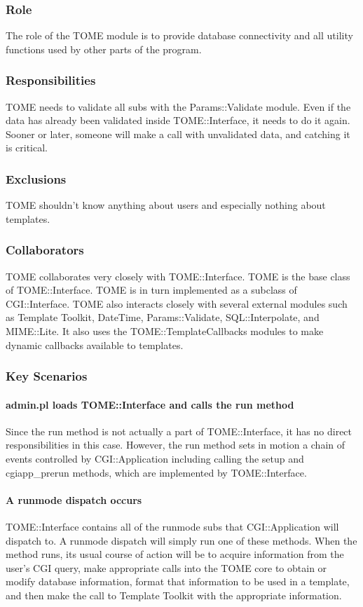 \documentclass[12pt,titlepage]{article}
\begin{document}
\subsubsection{Role}
The role of the TOME module is to provide database connectivity and all utility functions used by other parts of the program.
\subsubsection{Responsibilities}
TOME needs to validate all subs with the Params::Validate module. Even if the data has already been validated inside TOME::Interface, it needs to do it again. Sooner or later, someone will make a call with unvalidated data, and catching it is critical.
\subsubsection{Exclusions}
TOME shouldn't know anything about users and especially nothing about templates.
\subsubsection{Collaborators}
TOME collaborates very closely with TOME::Interface.  TOME is the base class of TOME::Interface.  TOME is in turn implemented as a subclass of CGI::Interface.  TOME also interacts closely with several external modules such as Template Toolkit, DateTime, Params::Validate, SQL::Interpolate, and MIME::Lite.  It also uses the TOME::TemplateCallbacks modules to make dynamic callbacks available to templates.
\subsubsection{Key Scenarios}
\paragraph{admin.pl loads TOME::Interface and calls the run method}
Since the run method is not actually a part of TOME::Interface, it has no direct responsibilities in this case.  However, the run method sets in motion a chain of events controlled by CGI::Application including calling the setup and cgiapp\_prerun methods, which are implemented by TOME::Interface.
\paragraph{A runmode dispatch occurs}
TOME::Interface contains all of the runmode subs that CGI::Application will dispatch to.  A runmode dispatch will simply run one of these methods.  When the method runs, its usual course of action will be to acquire information from the user's CGI query, make appropriate calls into the TOME core to obtain or modify database information, format that information to be used in a template, and then make the call to Template Toolkit with the appropriate information.
\end{document}
